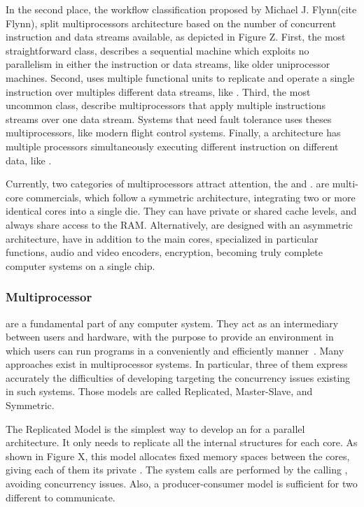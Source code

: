 			In the second place, the workflow classification proposed by Michael J. Flynn(cite Flynn),
			split multiprocessors architecture based on the number of concurrent
			instruction and data streams available, as depicted in Figure Z.
			First, the most straightforward class, \sisd describes a sequential
			machine which exploits no parallelism in either the instruction or
			data streams, like older uniprocessor machines.
			Second, \simd uses multiple functional units to replicate and operate
			a single instruction over multiples different data streams, like \gpu.
			Third, the most uncommon class, \misd describe multiprocessors that
			apply multiple instructions streams over one data stream.
			Systems that need fault tolerance uses theses multiprocessors, like
			modern flight control systems.
			Finally, a \mimd architecture has multiple processors simultaneously
			executing different instruction on different data, like \xeonphi.

			Currently, two categories of multiprocessors attract attention, the \cmp and \soc.
			\cmps are multi-core commercials, which follow a symmetric architecture,
			integrating two or more identical cores into a single die.
			They can have private or shared cache levels, and always share access
			to the RAM.
			Alternatively, \socs are designed with an asymmetric architecture,
			have in addition to the main cores, specialized \cpus in particular
			functions, \ie audio and video encoders, encryption, becoming truly
			complete computer systems on a single chip.

		\subsubsection{Multiprocessor \oses}

			\oses are a fundamental part of any computer system.
			They act as an intermediary between users and hardware, with the
			purpose to provide an environment in which users can run programs
			in a conveniently and efficiently manner~\cite{Abraham: book}.
			Many \os approaches exist in multiprocessor systems.
			In particular, three of them express accurately the difficulties
			of developing \oses targeting the concurrency issues existing in
			such systems.
			Those models are called Replicated, Master-Slave, and Symmetric.

			The Replicated Model is the simplest way to develop an \os for a
			parallel architecture.
			It only needs to replicate all the internal \os structures for each core.
			As shown in Figure X, this model allocates fixed memory spaces
			between the cores, giving each of them its private \os.
			The system calls are performed by the calling \cpu, avoiding concurrency issues.
			Also, a producer-consumer model is sufficient for two different \cpus to communicate.

